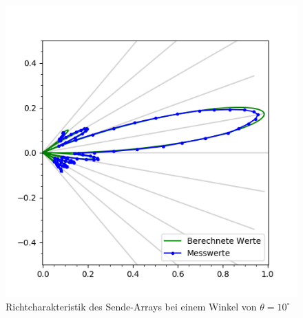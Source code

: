 \begin{figure}[htb]
\begin{minipage}{0.5\textwidth}
\includegraphics[width=\textwidth]{graphics/plot_test_characteristic_rect_10_polar.png}
\caption{Richtcharakteristik des Sende-Arrays bei einem Winkel von $\theta = 10^{\circ}$} %
\label{fig:plot_test_characteristic_rect_10_polar}
%
\end{minipage}
\begin{minipage}{0.5\textwidth}

\end{minipage}
\end{figure}
